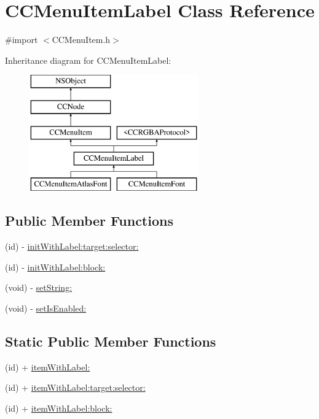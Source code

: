 \hypertarget{interface_c_c_menu_item_label}{\section{C\-C\-Menu\-Item\-Label Class Reference}
\label{interface_c_c_menu_item_label}
}


{\ttfamily \#import $<$C\-C\-Menu\-Item.\-h$>$}

Inheritance diagram for C\-C\-Menu\-Item\-Label\-:\begin{figure}[H]
\begin{center}
\leavevmode
\includegraphics[height=5.000000cm]{interface_c_c_menu_item_label}
\end{center}
\end{figure}
\subsection*{Public Member Functions}
\begin{DoxyCompactItemize}
\item 
(id) -\/ \hyperlink{interface_c_c_menu_item_label_a512770415e746933b76df784b96fd600}{init\-With\-Label\-:target\-:selector\-:}
\item 
(id) -\/ \hyperlink{interface_c_c_menu_item_label_a5c1ae04ec7216509b9be538729f30622}{init\-With\-Label\-:block\-:}
\item 
(void) -\/ \hyperlink{interface_c_c_menu_item_label_aeb4cb57bfbc2f9660a23af23794ab634}{set\-String\-:}
\item 
(void) -\/ \hyperlink{interface_c_c_menu_item_label_a5dc90465215ad4496be102a6717564e3}{set\-Is\-Enabled\-:}
\end{DoxyCompactItemize}
\subsection*{Static Public Member Functions}
\begin{DoxyCompactItemize}
\item 
(id) + \hyperlink{interface_c_c_menu_item_label_adf3a0d5559dc0b2579bd457bf6af8270}{item\-With\-Label\-:}
\item 
(id) + \hyperlink{interface_c_c_menu_item_label_aaf06b821b67e718444e25ca2f996a6f3}{item\-With\-Label\-:target\-:selector\-:}
\item 
(id) + \hyperlink{interface_c_c_menu_item_label_a256b3c8bd7609a86613088a8e6cef1bc}{item\-With\-Label\-:block\-:}
\end{DoxyCompactItemize}
